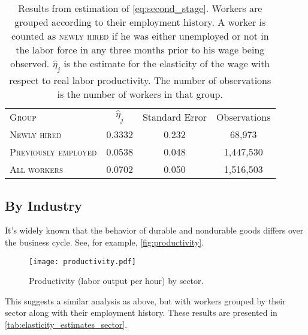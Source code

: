 \documentclass[11pt]{article}
\begin{document}
\begin{table}
    \centering
    \begin{tabular}{lccc} \toprule
        \textsc{Group}               & $\hat{\eta}_j$ & Standard Error & Observations\\
        \textsc{Newly hired}         & 0.3332       & 0.232            & 68,973       \\
        \textsc{Previously employed} & 0.0538       & 0.048            & 1,447,530     \\
        \textsc{All workers}         & 0.0702       & 0.050            & 1,516,503     \\ \bottomrule
    \end{tabular}
    \caption{
                Results from estimation of \autoref{eq:second_stage}.
                Workers are grouped according to their employment history.
                A worker is counted as \textsc{newly hired} if he was either unemployed
                or not in the labor force in any three months prior to his wage
                being observed. $\hat{\eta}_j$ is the estimate for the elasticity of the wage with respect to real labor productivity.
                The number of observations is the number of workers in that group.
            }
    \label{tab:elasticity_estimates}
\end{table}


\subsection{By Industry}

It's widely known that the behavior of durable and nondurable goods differs over the business cycle.
See, for example, \autoref{fig:productivity}.

\begin{figure}
    \begin{center}
      \texttt{[image: productivity.pdf]}
    \end{center}
    \caption{
             Productivity (labor output per hour) by sector.
            }
    \label{fig:productivity}
\end{figure}

This suggests a similar analysis as above, but with workers grouped by their sector along with their employment history.
These results are presented in \autoref{tab:elasticity_estimates_sector}.
\end{document}
